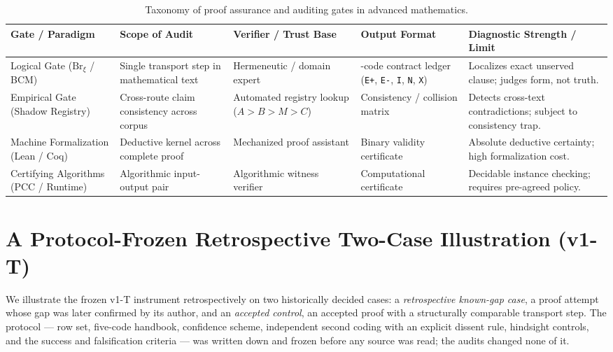 \documentclass[11pt,a4paper]{article}
\begin{document}
\begin{table}[htbp]
\centering
\footnotesize
\renewcommand{\arraystretch}{0.95}
\caption{Taxonomy of proof assurance and auditing gates in advanced mathematics.}
\label{tab:gate_taxonomy}\label{tab:tor_taxonomie}
\begin{tabularx}{\textwidth}{@{} >{\raggedright\arraybackslash}p{} >{\raggedright\arraybackslash}p{} >{\raggedright\arraybackslash}p{} >{\raggedright\arraybackslash}p{} >{\raggedright\arraybackslash}X@{}}
\toprule
Gate / Paradigm & Scope of Audit & Verifier / Trust Base & Output Format & Diagnostic Strength / Limit \\
\midrule
Logical Gate ($\mathrm{Br}_\xi$ / BCM) & Single transport step in mathematical text & Hermeneutic / domain expert & 5-code contract ledger (\texttt{E+}, \texttt{E-}, \texttt{I}, \texttt{N}, \texttt{X}) & Localizes exact unserved clause; judges form, not truth. \\
\addlinespace[4pt]
Empirical Gate (Shadow Registry) & Cross-route claim consistency across corpus & Automated registry lookup ($A>B>M>C$) & Consistency / collision matrix & Detects cross-text contradictions; subject to consistency trap. \\
\addlinespace[4pt]
Machine Formalization (Lean / Coq) & Deductive kernel across complete proof & Mechanized proof assistant & Binary validity certificate & Absolute deductive certainty; high formalization cost. \\
\addlinespace[4pt]
Certifying Algorithms (PCC / Runtime) & Algorithmic input-output pair & Algorithmic witness verifier & Com\-pu\-ta\-tion\-al cer\-tif\-i\-cate & Decidable instance checking; requires pre-agreed policy. \\
\bottomrule
\end{tabularx}
\end{table}

\section{A Protocol-Frozen Retrospective Two-Case Illustration
(v1-T)}\label{sec:calibration}

We illustrate the frozen v1-T instrument retrospectively on two historically
decided cases: a \emph{retrospective known-gap case}, a proof attempt whose
gap was later confirmed by its author, and an \emph{accepted control}, an
accepted proof with a structurally comparable transport step. The protocol ---
row set, five-code handbook, confidence scheme, independent second coding with
an explicit dissent rule, hindsight controls, and the success and falsification
criteria --- was written down and frozen before any source was read; the audits
changed none of it.
\end{document}
